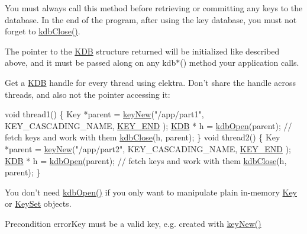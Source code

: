 You must always call this method before retrieving or committing any keys to the database. In the end of the program, after using the key database, you must not forget to \hyperlink{group__kdb_gadb54dc9fda17ee07deb9444df745c96f}{kdb\-Close()}.

The pointer to the {\ttfamily \hyperlink{classkdb_1_1KDB}{K\-D\-B}} structure returned will be initialized like described above, and it must be passed along on any kdb$\ast$() method your application calls.

Get a {\ttfamily \hyperlink{classkdb_1_1KDB}{K\-D\-B}} handle for every thread using elektra. Don't share the handle across threads, and also not the pointer accessing it\-:


\begin{DoxyCodeInclude}
\textcolor{keywordtype}{void} thread1()
\{
        Key *parent = \hyperlink{group__key_gad23c65b44bf48d773759e1f9a4d43b89}{keyNew}(\textcolor{stringliteral}{"/app/part1"}, KEY\_CASCADING\_NAME, \hyperlink{group__key_gga91fb3178848bd682000958089abbaf40aa8adb6fcb92dec58fb19410eacfdd403}{KEY\_END}
      );
        \hyperlink{classkdb_1_1KDB_a7e0637995ce9f294cdbc6f167df6db40}{KDB} * h = \hyperlink{group__kdb_ga6808defe5870f328dd17910aacbdc6ca}{kdbOpen}(parent);
        \textcolor{comment}{// fetch keys and work with them}
        \hyperlink{group__kdb_gadb54dc9fda17ee07deb9444df745c96f}{kdbClose}(h, parent);
\}
\textcolor{keywordtype}{void} thread2()
\{
        Key *parent = \hyperlink{group__key_gad23c65b44bf48d773759e1f9a4d43b89}{keyNew}(\textcolor{stringliteral}{"/app/part2"}, KEY\_CASCADING\_NAME, \hyperlink{group__key_gga91fb3178848bd682000958089abbaf40aa8adb6fcb92dec58fb19410eacfdd403}{KEY\_END}
      );
        \hyperlink{classkdb_1_1KDB_a7e0637995ce9f294cdbc6f167df6db40}{KDB} * h = \hyperlink{group__kdb_ga6808defe5870f328dd17910aacbdc6ca}{kdbOpen}(parent);
        \textcolor{comment}{// fetch keys and work with them}
        \hyperlink{group__kdb_gadb54dc9fda17ee07deb9444df745c96f}{kdbClose}(h, parent);
\}
\end{DoxyCodeInclude}
 You don't need \hyperlink{group__kdb_ga6808defe5870f328dd17910aacbdc6ca}{kdb\-Open()} if you only want to manipulate plain in-\/memory \hyperlink{classkdb_1_1Key}{Key} or \hyperlink{classkdb_1_1KeySet}{Key\-Set} objects.

\begin{DoxyPrecond}{Precondition}
error\-Key must be a valid key, e.\-g. created with \hyperlink{group__key_gad23c65b44bf48d773759e1f9a4d43b89}{key\-New()}
\end{DoxyPrecond}

